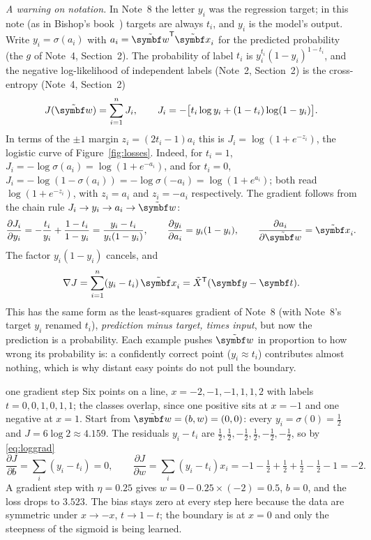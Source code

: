 \documentclass[11pt]{article}
\newcommand{\w}{\vect{w}}
\newcommand{\xt}{\tilde{\x}}
\newcommand{\wt}{\tilde{\w}}
\newcommand{\Xt}{\tilde X}
\begin{document}
\emph{A warning on notation.} In Note~8 the letter $y_i$ was the regression target; in this note (as in Bishop's
book~\cite{bishop2006}) targets are always $t_i$, and $y_i$ is the model's output. Write $y_i = \sigma(a_i)$ with $a_i =
\wt\T\xt_i$ for the predicted probability (the $g$ of Note~4, Section~2). The probability of label $t_i$ is $y_i^{t_i}(1 - y_i)^{1 - t_i}$, and the
negative log-likelihood of independent labels (Note~2, Section~2) is the cross-entropy (Note~4, Section~2)
\[
  J(\wt) = \sum_{i=1}^n J_i, \qquad J_i = -\big[t_i \log y_i + (1 - t_i)\log(1 - y_i)\big] .
\]
In terms of the $\pm1$ margin $z_i = (2t_i - 1)a_i$ this is $J_i = \log(1 + e^{-z_i})$, the logistic curve of
Figure~\ref{fig:losses}. Indeed, for $t_i = 1$, $J_i = -\log\sigma(a_i) = \log(1 + e^{-a_i})$, and for $t_i = 0$, $J_i =
-\log(1 - \sigma(a_i)) = -\log\sigma(-a_i) = \log(1 + e^{a_i})$; both read $\log(1 + e^{-z_i})$, with $z_i = a_i$ and
$z_i = -a_i$ respectively. The gradient follows from the chain rule $J_i \to y_i \to a_i \to \wt$:
\[
  \frac{\partial J_i}{\partial y_i} = -\frac{t_i}{y_i} + \frac{1 - t_i}{1 - y_i} = \frac{y_i - t_i}{y_i(1 - y_i)} , \qquad
  \frac{\partial y_i}{\partial a_i} = y_i(1 - y_i) , \qquad
  \frac{\partial a_i}{\partial \wt} = \xt_i .
\]
The factor $y_i(1 - y_i)$ cancels, and
\begin{equation}\label{eq:loggrad}
  \nabla J = \sum_{i=1}^n (y_i - t_i)\,\xt_i = \Xt\T(\vect{y} - \vect{t}) .
\end{equation}
This has the same form as the least-squares gradient of Note~8 (with Note~8's target $y_i$ renamed $t_i$),
\emph{prediction minus target, times input}, but now the prediction is a probability. Each example pushes $\wt$ in proportion to how wrong its probability is: a confidently correct point
($y_i \approx t_i$) contributes almost nothing, which is why distant easy points do not pull the boundary.

\begin{worked}{one gradient step}
Six points on a line, $x = -2, -1, -1, 1, 1, 2$ with labels $t = 0, 0, 1, 0, 1, 1$; the classes overlap, since one
positive sits at $x = -1$ and one negative at $x = 1$. Start from $\wt = (b, w) = (0, 0)$: every $y_i = \sigma(0) = \frac12$
and $J = 6\log 2 \approx 4.159$. The residuals $y_i - t_i$ are $\frac12, \frac12, -\frac12, \frac12, -\frac12, -\frac12$, so
by \eqref{eq:loggrad}
\[
  \frac{\partial J}{\partial b} = \textstyle\sum_i (y_i - t_i) = 0, \qquad
  \frac{\partial J}{\partial w} = \textstyle\sum_i (y_i - t_i)x_i = -1 - \tfrac12 + \tfrac12 + \tfrac12 - \tfrac12 - 1 = -2 .
\]
A gradient step with $\eta = 0.25$ gives $w = 0 - 0.25 \times (-2) = 0.5$, $b = 0$, and the loss drops to $3.523$. The
bias stays zero at every step here because the data are symmetric under $x \to -x$, $t \to 1 - t$; the boundary is at
$x = 0$ and only the steepness of the sigmoid is being learned.
\end{worked}
\end{document}
